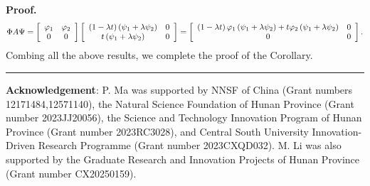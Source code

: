 \documentclass{article}%
\newenvironment{proof}[1][Proof]{\noindent\textbf{#1.} }{\ \rule{0.5em}{0.5em}}
\begin{document}
\begin{proof}
\begin{align}
\Phi A\Psi=\left[
\begin{array}
[c]{cc}%
\varphi_{1} & \varphi_{2}\\
0 & 0
\end{array}
\right]  \left[
\begin{array}
[c]{cc}%
\left(  1-\lambda t\right)  \left(  \psi_{1}+\lambda\psi_{2}\right)  & 0\\
t\left(  \psi_{1}+\lambda\psi_{2}\right)  & 0
\end{array}
\right]  =\left[
\begin{array}
[c]{cc}%
\left(  1-\lambda t\right)  \varphi_{1}\left(  \psi_{1}+\lambda\psi
_{2}\right)  +t\varphi_{2}\left(  \psi_{1}+\lambda\psi_{2}\right)  & 0\\
0 & 0
\end{array}
\right]  .\nonumber
\end{align}
Combing all the above results, we complete the proof of the Corollary.
\end{proof}

\noindent\textbf{Acknowledgement}: P. Ma was supported by NNSF of China (Grant
numbers 12171484,12571140), the Natural Science Foundation of Hunan
Province (Grant number 2023JJ20056), the Science and Technology Innovation
Program of Hunan Province (Grant number 2023RC3028), and Central South
University Innovation-Driven Research Programme (Grant number 2023CXQD032). M.
Li was also supported by the Graduate Research and Innovation Projects of Hunan Province (Grant number CX20250159).

\bigskip
\end{document}
